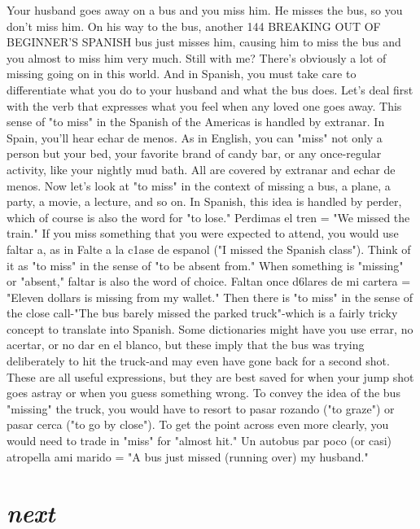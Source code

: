 \documentclass[14pt,a4paper,oneside]{memoir}
\begin{document}
Your husband goes away on a bus and you miss him. He
misses the bus, so you don't miss him. On his way to the bus, another
144 BREAKING OUT OF BEGINNER'S SPANISH
bus just misses him, causing him to miss the bus and you almost to
miss him very much. Still with me? There's obviously a lot of missing
going on in this world. And in Spanish, you must take care to differentiate what you do to your husband and what the bus does.
Let's deal first with the verb that expresses what you feel
when any loved one goes away. This sense of "to miss" in the Spanish
of the Americas is handled by extranar. In Spain, you'll hear echar de
menos. As in English, you can "miss" not only a person but your bed,
your favorite brand of candy bar, or any once-regular activity, like your
nightly mud bath. All are covered by extranar and echar de menos.
Now let's look at "to miss" in the context of missing a bus,
a plane, a party, a movie, a lecture, and so on. In Spanish, this idea is
handled by perder, which of course is also the word for "to lose." Perdimas el tren = "We missed the train." If you miss something that
you were expected to attend, you would use faltar a, as in Falte a la
c1ase de espanol ("I missed the Spanish class"). Think of it as "to
miss" in the sense of "to be absent from." When something is "missing" or "absent," faltar is also the word of choice. Faltan once d6lares
de mi cartera = "Eleven dollars is missing from my wallet."
Then there is "to miss" in the sense of the close call-"The
bus barely missed the parked truck"-which is a fairly tricky concept
to translate into Spanish. Some dictionaries might have you use errar,
no acertar, or no dar en el blanco, but these imply that the bus was
trying deliberately to hit the truck-and may even have gone back for
a second shot. These are all useful expressions, but they are best saved
for when your jump shot goes astray or when you guess something
wrong. To convey the idea of the bus "missing" the truck, you would
have to resort to pasar rozando ("to graze") or pasar cerca ("to go by
close"). To get the point across even more clearly, you would need to
trade in "miss" for "almost hit." Un autobus par poco (or casi) atropella ami marido = "A bus just missed (running over) my husband."

\section{\emph{next}}
\end{document}

